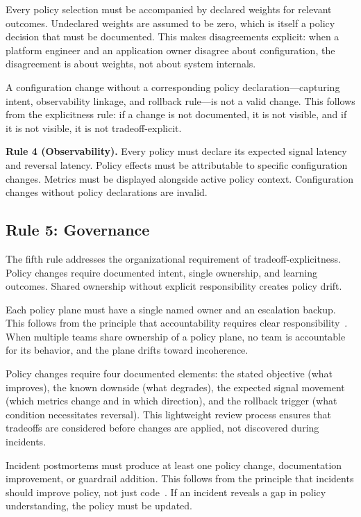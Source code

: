 \documentclass[conference]{IEEEtran}
\begin{document}
Every policy selection must be accompanied by declared weights for relevant outcomes. Undeclared weights are assumed to be zero, which is itself a policy decision that must be documented. This makes disagreements explicit: when a platform engineer and an application owner disagree about configuration, the disagreement is about weights, not about system internals.

A configuration change without a corresponding policy declaration---capturing intent, observability linkage, and rollback rule---is not a valid change. This follows from the explicitness rule: if a change is not documented, it is not visible, and if it is not visible, it is not tradeoff-explicit.

\textbf{Rule 4 (Observability).} Every policy must declare its expected signal latency and reversal latency. Policy effects must be attributable to specific configuration changes. Metrics must be displayed alongside active policy context. Configuration changes without policy declarations are invalid.

\subsection{Rule 5: Governance}

The fifth rule addresses the organizational requirement of tradeoff-explicitness. Policy changes require documented intent, single ownership, and learning outcomes. Shared ownership without explicit responsibility creates policy drift.

Each policy plane must have a single named owner and an escalation backup. This follows from the principle that accountability requires clear responsibility~\cite{leveson}. When multiple teams share ownership of a policy plane, no team is accountable for its behavior, and the plane drifts toward incoherence.

Policy changes require four documented elements: the stated objective (what improves), the known downside (what degrades), the expected signal movement (which metrics change and in which direction), and the rollback trigger (what condition necessitates reversal). This lightweight review process ensures that tradeoffs are considered before changes are applied, not discovered during incidents.

Incident postmortems must produce at least one policy change, documentation improvement, or guardrail addition. This follows from the principle that incidents should improve policy, not just code~\cite{sre}. If an incident reveals a gap in policy understanding, the policy must be updated.
\end{document}
